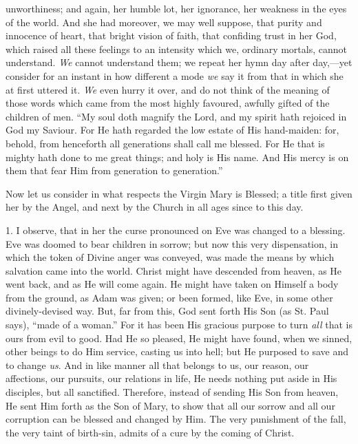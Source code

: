 unworthiness; and again, her humble lot, her ignorance, her weakness in
the eyes of the world. And she had moreover, we may well suppose, that
purity and innocence of heart, that bright vision of faith, that
confiding trust in her God, which raised all these feelings to an
intensity which we, ordinary mortals, cannot understand. \emph{We}
cannot understand them; we repeat her hymn day after day,—yet consider
for an instant in how different a mode \emph{we} say it from that in
which she at first uttered it. \emph{We} even hurry it over, and do not
think of the meaning of those words which came from the most highly
favoured, awfully gifted of the children of men. ``My soul doth
magnify the Lord, and my spirit hath rejoiced in God my Saviour. For He
hath regarded the low estate of His hand-maiden: for, behold, from
henceforth all generations shall call me blessed. For He that is mighty
hath done to me great things; and holy is His name. And His mercy is on
them that fear Him from generation to generation.''

Now let us consider in what respects the Virgin Mary is Blessed; a
title first given her by the Angel, and next by the Church in all ages
since to this day.

1. I observe, that in her the curse pronounced on Eve was changed to
a blessing. Eve was doomed to bear children in sorrow; but now this very
dispensation, in which the token of Divine anger was conveyed, was made
the means by which salvation came into the world. Christ might have
descended from heaven, as He went back, and as He will come again. He
might have taken on Himself a body from the ground, as Adam was given;
or been formed, like Eve, in some other divinely-devised way. But, far
from this, God sent forth His Son (as St. Paul says), ``made of a
woman.'' For it has been His gracious purpose to turn \emph{all}
that is ours from evil to good. Had He so pleased, He might have found,
when we sinned, other beings to do Him service, casting us into hell;
but He purposed to save and to change \emph{us}. And in like manner all
that belongs to us, our reason, our affections, our pursuits, our
relations in life, He needs nothing put aside in His disciples, but all
sanctified. Therefore, instead of sending His Son from heaven, He sent
Him forth as the Son of Mary, to show that all our sorrow and all our
corruption can be blessed and changed by Him. The very punishment of the
fall, the very taint of birth-sin, admits of a cure by the coming of
Christ.

